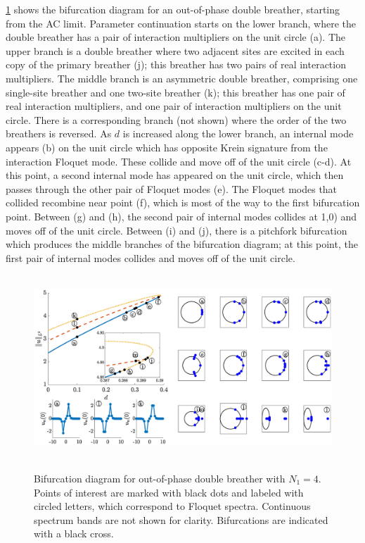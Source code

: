 \documentclass[12pt,reqno]{amsart}
\theoremstyle{definition}
\begin{document}
\cref{fig:bifdiagSGoop1} shows the bifurcation diagram for an out-of-phase double breather, starting from the AC limit. Parameter continuation starts on the lower branch, where the double breather has a pair of interaction multipliers on the unit circle (a). The upper branch is a double breather where two adjacent sites are excited in each copy of the primary breather (j); this breather has two pairs of real interaction multipliers. The middle branch is an asymmetric double breather, comprising one single-site breather and one two-site breather (k); this breather has one pair of real interaction multipliers, and one pair of interaction multipliers on the unit circle. There is a corresponding branch (not shown) where the order of the two breathers is reversed. As $d$ is increased along the lower branch, an internal mode appears (b) on the unit circle which has opposite Krein signature from the interaction Floquet mode. These collide and move off of the unit circle (c-d). At this point, a second internal mode has appeared on the unit circle, which then passes through the other pair of Floquet modes (e). The Floquet modes that collided recombine near point (f), which is most of the way to the first bifurcation point. Between (g) and (h), the second pair of internal modes collides at 1,0) and moves off of the unit circle. Between (i) and (j), there is a pitchfork bifurcation which produces the middle branches of the bifurcation diagram; at this point, the first pair of internal modes collides and moves off of the unit circle.

\begin{figure}
	\hbox{
	\hspace{-2cm}
	\includegraphics[width=20cm]{bifdiagSGoppositeN4.eps} 
	}
	\caption{Bifurcation diagram for out-of-phase double breather with $N_1 = 4$. Points of interest are marked with black dots and labeled with circled letters, which correspond to Floquet spectra. Continuous spectrum bands are not shown for clarity. Bifurcations are indicated with a black cross.}
	\label{fig:bifdiagSGoop1}
\end{figure}
\end{document}
